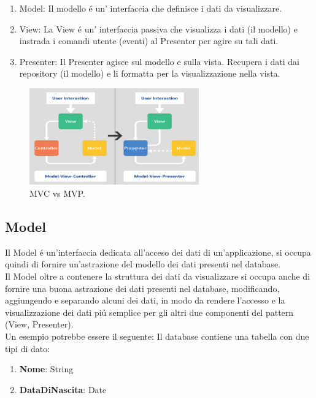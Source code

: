    \begin{enumerate}
   \item Model: Il modello \'e un' interfaccia che definisce i dati da visualizzare.
   \item View: La View \'e un' interfaccia passiva che visualizza i dati (il modello) e instrada i comandi utente (eventi) al Presenter per agire su tali dati.
   \item Presenter: Il Presenter agisce sul modello e sulla vista. Recupera i dati dai repository (il modello) e li formatta per la visualizzazione nella vista.
   \end{enumerate}

   \begin{figure}[!h]
     \centering
     \includegraphics[width=0.65\textwidth]{immagini/mvc-vs-mvp.jpg}
     \caption{MVC vs MVP.}\label{fig:MVC vs MVP}
   \end{figure}

   \newpage


   \subsection{Model}
   Il Model \'e un'interfaccia dedicata all'acceso dei dati di un'applicazione, si occupa quindi di fornire un'astrazione del modello dei dati presenti nel database.\\
   Il Model oltre a contenere la struttura dei dati da visualizzare si occupa anche di fornire una buona astrazione dei dati presenti nel database, modificando, aggiungendo e separando alcuni dei dati, in modo da rendere l'accesso e la visualizzazione dei dati pi\'u semplice per gli altri due componenti del pattern (View, Presenter).\\
   Un esempio potrebbe essere il seguente:
   Il database contiene una tabella con due tipi di dato:

   \begin{enumerate}
   \item \textbf{Nome}: String
   \item \textbf{DataDiNascita}: Date
   \end{enumerate}


